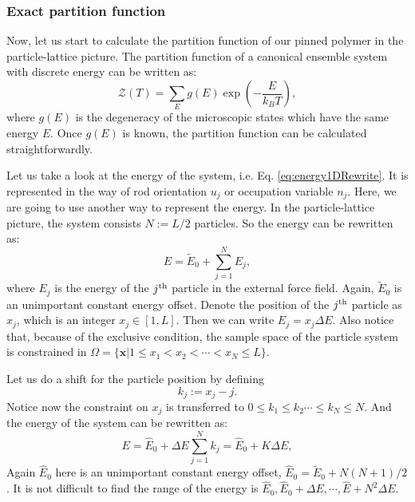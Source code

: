 \subsubsection{Exact partition function}
\label{ssub:Exact Partition Function}
Now, let us start to calculate the partition function of our pinned polymer in the particle-lattice picture. The partition function of a canonical ensemble system with discrete energy can be written as:
\begin{equation}
    \label{eq:partitionFuncCanonical}
    \mathcal{Z}\left(T\right) = \sum_{E}g(E)\exp \left(-\frac{E}{k_B T}\right),
\end{equation}
where $g(E)$ is the degeneracy of the microscopic states which have the same energy $E$. Once $g(E)$ is known, the partition function can be calculated straightforwardly.

Let us take a look at the energy of the system, i.e. Eq. \eqref{eq:energy1DRewrite}. It is represented in the way of rod orientation $u_j$ or occupation variable $n_j$. Here, we are going to use another way to represent the energy. In the particle-lattice picture, the system consists $N:=L/2$ particles. So the energy can be rewritten as:
\begin{equation}
    E = \tilde{E}_0 + \sum_{j=1}^N E_j,
\end{equation}
where $E_j$ is the energy of the $j^{\rm{th}}$ particle in the external force field. Again, $\tilde{E}_0$ is an unimportant constant energy offset. Denote the position of the $j^{\rm{th}}$ particle as $x_j$, which is an integer $x_j\in[1, L]$. Then we can write $E_j = x_j \Delta E$. 
Also notice that, because of the exclusive condition, the sample space of the particle system is constrained in $\Omega = \{\mathbf{x}| 1\leqslant x_1<x_2<\cdots<x_N\leqslant L\}$.

Let us do a shift for the particle position by defining
\begin{equation}
    k_j := x_j - j.
\end{equation}
Notice now the constraint on $x_j$ is transferred to $0 \leqslant k_1 \leqslant k_2 \cdots \leqslant k_N \leqslant N$. And the energy of the system can be rewritten as:
\begin{equation}
    E = \hat{E}_0 + \Delta E \sum_{j=1}^N k_j = \hat{E}_0 + K \Delta E,
\end{equation}
Again $\hat{E}_0$ here is an unimportant constant energy offset, $\hat{E}_0 = \tilde{E}_0+N(N+1)/2$. 
It is not difficult to find the range of the energy is $\hat{E}_0, \hat{E}_0 + \Delta E, \cdots, \hat{E}+N^2\Delta E$. 

